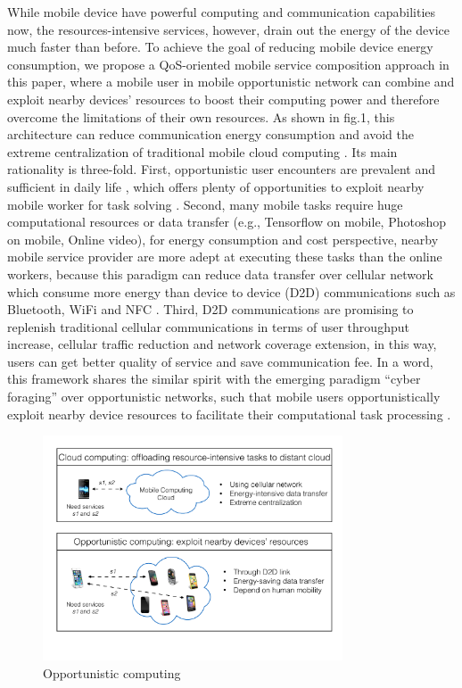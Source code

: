 \documentclass[10pt,journal,compsoc]{IEEEtran}
\begin{document}
While mobile device have powerful computing and communication capabilities now, the resources-intensive services, however, drain out the energy of the device much faster than before. 
To achieve the goal of reducing mobile device energy consumption, we propose a QoS-oriented mobile service composition approach in this paper, where a mobile user in mobile opportunistic network can combine and exploit nearby devices' resources to boost their computing power and therefore overcome the limitations of their own resources. As shown in fig.1, this architecture can reduce communication energy consumption and avoid the extreme centralization of traditional mobile cloud computing \cite{Giordano2011}. Its main rationality is three-fold. First, opportunistic user encounters are prevalent and sufficient in daily life \cite{liu2013exploring}, which offers plenty of opportunities to exploit nearby mobile worker for task solving \cite{chang2015progressive,heimerl2012communitysourcing,agapie2015crowdsourcing}. Second, many mobile tasks require huge computational resources or data transfer (e.g., Tensorflow on mobile, Photoshop on mobile, Online video), for energy consumption and cost perspective, nearby mobile service provider are more adept at executing these tasks than the online workers, because this paradigm can reduce data transfer over cellular network which consume more energy than device to device (D2D) communications such as Bluetooth, WiFi and NFC \cite{Balani}. Third, D2D communications are promising to replenish traditional cellular communications in terms of user throughput increase, cellular traffic reduction and network coverage extension, in this way, users can get better quality of service and save communication fee\cite{asadi2014survey}. In a word, this framework shares the similar spirit with the emerging paradigm “cyber foraging” over opportunistic networks, such that mobile users opportunistically exploit nearby device resources to facilitate their computational task processing \cite{shi2012serendipity,li2014can,zhang2015offloading}.

\begin{figure}[!t]
\centering
\includegraphics[width=3.5in]{./img/pic1.pdf}
\caption{Opportunistic computing}
\label{fig_opportunistic}
\end{figure}
\end{document}
